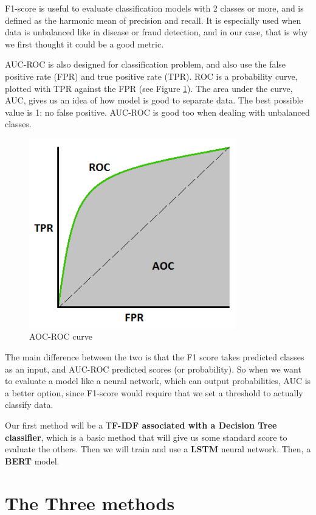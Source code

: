 \documentclass[11pt]{scrartcl}
\begin{document}
F1-score is useful to evaluate classification models with 2 classes or more, and is defined as the harmonic mean of precision and recall. It is especially used when data is unbalanced like in disease or fraud detection, and in our case, that is why we first thought it could be a good metric.

AUC-ROC is also designed for classification problem, and also use the false positive rate (FPR) and true positive rate (TPR). ROC is a probability curve, plotted with TPR against the FPR (see Figure \ref{fig:aoc}). The area under the curve, AUC, gives us an idea of how model is good to separate data. The best possible value is 1: no false positive. AUC-ROC is good too when dealing with unbalanced classes.


\begin{figure}[h]
    \centering
    \includegraphics[width=9cm]{img/auc.png}
    \caption{AOC-ROC curve \cite{narkhede_2018}}
    \label{fig:aoc}
\end{figure}


The main difference between the two is that the F1 score takes predicted classes as an input, and AUC-ROC predicted scores (or probability). So when we want to evaluate a model like a neural network, which can output probabilities, AUC is a better option, since F1-score would require that we set a threshold to actually classify data.

Our first method will be a T\textbf{F-IDF associated with a Decision Tree classifier}, which is a basic method that will give us some standard score to evaluate the others. Then we will train and use a \textbf{LSTM} neural network. Then, a \textbf{BERT} model.

\section{The Three methods}
\end{document}
